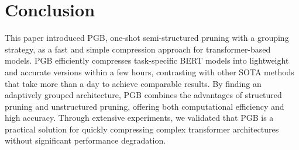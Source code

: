 \section{Conclusion}
This paper introduced PGB, one-shot semi-structured pruning with a grouping strategy, as a fast and simple compression approach for transformer-based models. PGB efficiently compresses task-specific BERT models into lightweight and accurate versions within a few hours, contrasting with other SOTA methods that take more than a day to achieve comparable results. By finding an adaptively grouped architecture, PGB combines the advantages of structured pruning and unstructured pruning, offering both computational efficiency and high accuracy. Through extensive experiments, we validated that PGB is a practical solution for quickly compressing complex transformer architectures without 
 significant performance degradation.

